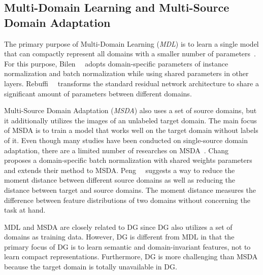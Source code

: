 \subsection{Multi-Domain Learning and Multi-Source Domain Adaptation}
The primary purpose of Multi-Domain Learning (\textit{MDL}) is to learn a single model that can compactly represent all domains with a smaller number of parameters~\cite{yang2015mdlmtl, Rebuffi17, Bilen17, Rebuffi18}. For this purpose, Bilen~\etal~\cite{Bilen17} adopts domain-specific parameters of instance normalization and batch normalization while using shared parameters in other layers. Rebuffi~\etal~\cite{Rebuffi17} transforms the standard residual network architecture to share a significant amount of parameters between different domains.

Multi-Source Domain Adaptation (\textit{MSDA}) also uses a set of source domains, but it additionally utilizes the images of an unlabeled target domain. The main focus of MSDA is to train a model that works well on the target domain without labels of it. Even though many studies have been conducted on single-source domain adaptation, there are a limited number of researches on MSDA~\cite{Zhao2018NIPS, Chang2019cvpr, guo2018-multi, peng2018moment}. Chang~\etal~\cite{Chang2019cvpr} proposes a domain-specific batch normalization with shared weights parameters and extends their method to MSDA. Peng~\etal~\cite{peng2018moment} suggests a way to reduce the moment distance between different source domains as well as reducing the distance between target and source domains. The moment distance measures the difference between feature distributions of two domains without concerning the task at hand.

MDL and MSDA are closely related to DG since DG also utilizes a set of domains as training data. However, DG is different from MDL in that the primary focus of DG is to learn semantic and domain-invariant features, not to learn compact representations. Furthermore, DG is more challenging than MSDA because the target domain is totally unavailable in DG.


